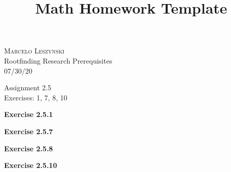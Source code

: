 \documentclass[12pt,oneside]{article}
\newenvironment{exercise}[1]{\vspace{.1in}\noindent\textbf{Exercise #1 \hspace{.05em}}}{}
\begin{document}
\title{Math Homework Template}

\begin{flushright}
\textsc{Marcelo Leszynski}  \\
Rootfinding Research Prerequisites\\
07/30/20
\end{flushright}

\begin{center}
\textsf{Assignment 2.5 } \\
\textsf{Exercises: 1, 7, 8, 10 }
\end{center}


\begin{exercise}{2.5.1}

\end{exercise}


\begin{exercise}{2.5.7}

\end{exercise}


\begin{exercise}{2.5.8}

\end{exercise}


\begin{exercise}{2.5.10}

\end{exercise}


\end{document}
